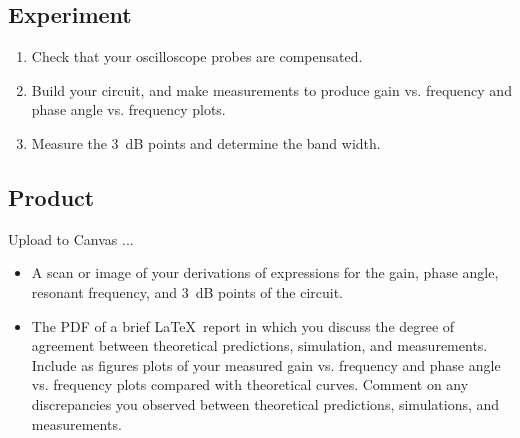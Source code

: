 \documentclass[11pt]{article}
\begin{document}
\subsection*{Experiment}

\begin{enumerate}
\item Check that your oscilloscope probes are compensated.

\item Build your circuit, and make measurements to produce gain
  vs. frequency and phase angle vs. frequency plots.

\item Measure the 3~dB points and determine the band width.
\end{enumerate}

\subsection*{Product}

Upload to Canvas ...
\begin{itemize}
\item A scan or image of your derivations of expressions for the gain,
  phase angle, resonant frequency, and 3~dB points of the circuit. 

\item The PDF of a brief \LaTeX\ report in which you discuss the
  degree of agreement between theoretical predictions, simulation, and
  measurements. Include as figures plots of your measured gain
  vs. frequency and phase angle vs. frequency plots compared with
  theoretical curves. Comment on any discrepancies you observed
  between theoretical predictions, simulations, and measurements.
\end{itemize}
\end{document}
